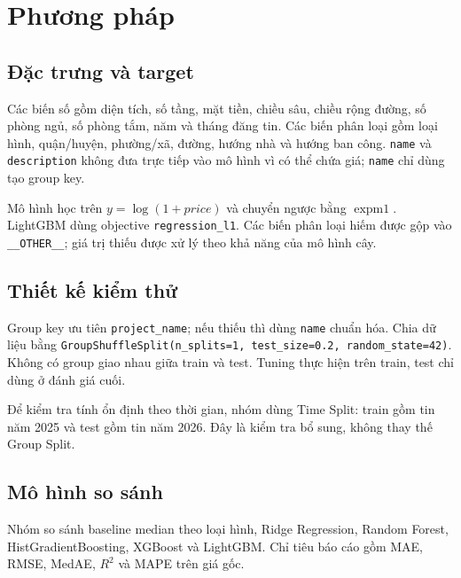 \documentclass[11pt,a4paper]{article}
\begin{document}
\section{Phương pháp}
\subsection{Đặc trưng và target}
Các biến số gồm diện tích, số tầng, mặt tiền, chiều sâu, chiều rộng đường, số phòng ngủ, số phòng tắm, năm và tháng đăng tin. Các biến phân loại gồm loại hình, quận/huyện, phường/xã, đường, hướng nhà và hướng ban công. \texttt{name} và \texttt{description} không đưa trực tiếp vào mô hình vì có thể chứa giá; \texttt{name} chỉ dùng tạo group key.

Mô hình học trên $y=\log(1+price)$ và chuyển ngược bằng $\operatorname{expm1}$. LightGBM dùng objective \texttt{regression\_l1}. Các biến phân loại hiếm được gộp vào \texttt{\_\_OTHER\_\_}; giá trị thiếu được xử lý theo khả năng của mô hình cây.

\subsection{Thiết kế kiểm thử}
Group key ưu tiên \texttt{project\_name}; nếu thiếu thì dùng \texttt{name} chuẩn hóa. Chia dữ liệu bằng \texttt{GroupShuffleSplit(n\_splits=1, test\_size=0.2, random\_state=42)}. Không có group giao nhau giữa train và test. Tuning thực hiện trên train, test chỉ dùng ở đánh giá cuối.

Để kiểm tra tính ổn định theo thời gian, nhóm dùng Time Split: train gồm tin năm 2025 và test gồm tin năm 2026. Đây là kiểm tra bổ sung, không thay thế Group Split.

\subsection{Mô hình so sánh}
Nhóm so sánh baseline median theo loại hình, Ridge Regression, Random Forest, HistGradientBoosting, XGBoost và LightGBM. Chỉ tiêu báo cáo gồm MAE, RMSE, MedAE, $R^2$ và MAPE trên giá gốc.
\newpage

\end{document}
